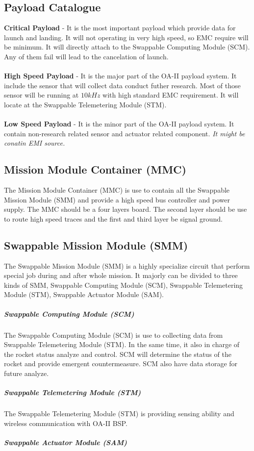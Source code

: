 \documentclass[12pt,article]{memoir}
\begin{document}
\subsection{Payload Catalogue}
\textbf{Critical Payload} - It is the most important payload which provide data for launch and landing. It will not operating in very high speed, so EMC require will be minimum. It will directly attach to the Swappable Computing Module (SCM). Any of them fail will lead to the cancelation of launch.\\\\
\textbf{High Speed Payload} - It is the major part of the OA-II payload system. It include the sensor that will collect data conduct futher research. Most of those sensor will be running at $10kHz$ with high standard EMC requirement. It will locate at the Swappable Telemetering Module (STM).\\\\
\textbf{Low Speed Payload} - It is the minor part of the OA-II payload system. It contain non-research related sensor and actuator related component. \textit{It might be conatin EMI source.}

\subsection{Mission Module Container (MMC)}
The Mission Module Container (MMC) is use to contain all the Swappable Mission Module (SMM) and provide a high speed bus controller and power supply. The MMC should be a four layers board. The second layer should be use to route high speed traces and the first and third layer be signal ground.
\subsection{Swappable Mission Module (SMM)}
The Swappable Mission Module (SMM) is a highly specialize circuit that perform special job during and after whole mission. It majorly can be divided to three kinds of SMM, Swappable Computing Module (SCM), Swappable Telemetering Module (STM), Swappable Actuator Module (SAM).
\subparagraph{Swappable Computing Module (SCM)}
The Swappable Computing Module (SCM) is use to collecting data from Swappable Telemetering Module (STM). In the same time, it also in charge of the rocket status analyze and control. SCM will determine the status of the rocket and provide emergent countermeasure. SCM also have data storage for future analyze.
\subparagraph{Swappable Telemetering Module (STM)}
The Swappable Telemetering Module (STM) is providing sensing ability and wireless communication with OA-II BSP.
\subparagraph{Swappable Actuator Module (SAM)}
\end{document}
